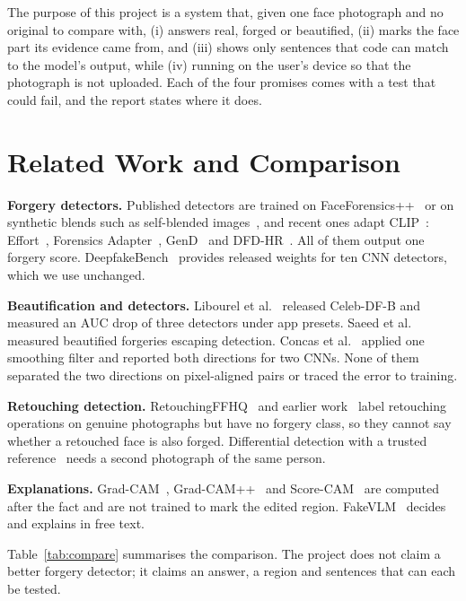\documentclass[conference,a4paper]{IEEEtran}
\begin{document}
The purpose of this project is a system that, given one face photograph and no original to compare with, (i) answers real,
forged or beautified, (ii) marks the face part its evidence came from, and (iii) shows only sentences that code can match to
the model's output, while (iv) running on the user's device so that the photograph is not uploaded. Each of the four promises
comes with a test that could fail, and the report states where it does.

\section{Related Work and Comparison}
\label{sec:related}

\textbf{Forgery detectors.} Published detectors are trained on FaceForensics++~\cite{ffpp} or on synthetic blends such as
self-blended images~\cite{sbi}, and recent ones adapt CLIP~\cite{clip}: Effort~\cite{effort}, Forensics Adapter~\cite{forensicsadapter},
GenD~\cite{gend2026} and DFD-HR~\cite{dfdhr2026}. All of them output one forgery score. DeepfakeBench~\cite{deepfakebench}
provides released weights for ten CNN detectors, which we use unchanged.

\textbf{Beautification and detectors.} Libourel et al.~\cite{libourel2024} released Celeb-DF-B and measured an AUC drop of
three detectors under app presets. Saeed et al.~\cite{saeed2025} measured beautified forgeries escaping detection. Concas et
al.~\cite{concas2025} applied one smoothing filter and reported both directions for two CNNs. None of them separated the two
directions on pixel-aligned pairs or traced the error to training.

\textbf{Retouching detection.} RetouchingFFHQ~\cite{retouchingffhq} and earlier work~\cite{bharati2016,jain2018} label
retouching operations on genuine photographs but have no forgery class, so they cannot say whether a retouched face is also
forged. Differential detection with a trusted reference~\cite{rathgeb2020diff} needs a second photograph of the same person.

\textbf{Explanations.} Grad-CAM~\cite{gradcam}, Grad-CAM++~\cite{gradcampp} and Score-CAM~\cite{scorecam} are computed after
the fact and are not trained to mark the edited region. FakeVLM~\cite{fakevlm2025} decides and explains in free text.

Table~\ref{tab:compare} summarises the comparison. The project does not claim a better forgery detector; it claims an answer,
a region and sentences that can each be tested.
\end{document}
